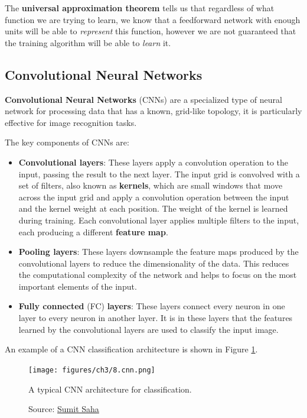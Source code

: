 The \textbf{universal approximation theorem} \cite{HORNIK1989359}
tells us that regardless of what function
we are trying to learn, we know that a feedforward network with enough units
will be able to \emph{represent} this
function, however we are not guaranteed that the training algorithm will be able
to \emph{learn} it.

\subsection{Convolutional Neural Networks}
\label{sec:cnn}

\textbf{Convolutional Neural Networks} (CNNs) are a specialized type of neural network
for processing data that has a known, grid-like topology,
it is particularly effective for image recognition tasks.

The key components of CNNs are:
\begin{itemize}
    \item \textbf{Convolutional layers}: These layers apply a convolution operation
    to the input, passing the result to the next layer.
    The input grid is convolved with a set of filters,
    also known as \textbf{kernels}, which are small windows that move across the input grid
    and apply a convolution operation between the input and the kernel weight
    at each position. The weight of the kernel is learned during training.
    Each convolutional layer applies multiple filters to the input, each producing
    a different \textbf{feature map}.
    \item \textbf{Pooling layers}: These layers downsample the feature maps
    produced by the convolutional layers to reduce the dimensionality of the data.
    This reduces the computational complexity of the network and helps to focus
    on the most important elements of the input.
    \item \textbf{Fully connected} (FC) \textbf{layers}: These layers connect every neuron
    in one layer to every neuron in another layer.
    It is in these layers that the features learned by the convolutional layers
    are used to classify the input image.
\end{itemize}
An example of a CNN classification architecture is shown in Figure \ref{fig:cnn}.

\begin{figure}[h]
    \centering
    \texttt{[image: figures/ch3/8.cnn.png]}
    \caption{A typical CNN architecture for classification.}
    \vspace{-10px}
    \caption*{\scriptsize{Source: \href{https://towardsdatascience.com/a-comprehensive-guide-to-convolutional-neural-networks-the-eli5-way-3bd2b1164a53}{Sumit Saha}}}
    \label{fig:cnn}
\end{figure}

